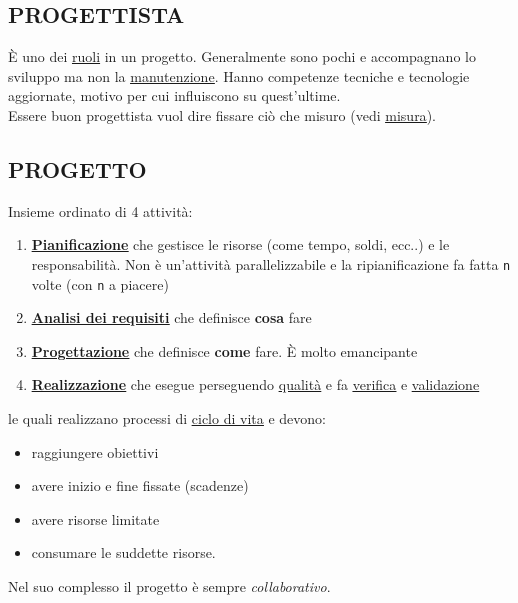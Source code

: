 		\subsection{PROGETTISTA}  \label{progettista}
		È uno dei \underline{\hyperref[ruoli]{ruoli}} in un progetto. Generalmente sono pochi e accompagnano lo sviluppo ma non la \underline{\hyperref[manutenzione]{manutenzione}}. Hanno competenze tecniche e tecnologie aggiornate, motivo per cui influiscono su quest'ultime. \\
		Essere buon progettista vuol dire fissare ciò che misuro (vedi \underline{\hyperref[misura]{misura}}).

		\subsection{PROGETTO}  \label{progetto}
		Insieme ordinato di 4 attività:
			\begin{enumerate}
				\item \underline{\hyperref[pianificazione]{\textbf{Pianificazione}}} che gestisce le risorse (come tempo, soldi, ecc..) e le responsabilità. Non è un'attività parallelizzabile e la ripianificazione fa fatta \texttt{n} volte (con \texttt{n} a piacere)
				\item \underline{\hyperref[analisideirequisiti]{\textbf{Analisi dei requisiti}}} che definisce \textbf{cosa} fare
				\item \underline{\hyperref[progettazione]{\textbf{Progettazione}}} che definisce \textbf{come} fare. È molto emancipante
				\item \underline{\hyperref[realizzazione]{\textbf{Realizzazione}}} che esegue perseguendo \underline{\hyperref[qualita]{qualità}} e fa \underline{\hyperref[verificare]{verifica}} e \underline{\hyperref[validare]{validazione}}
			\end{enumerate}
		le quali realizzano processi di \underline{\hyperref[ciclo]{ciclo di vita}} e devono:
			\begin {itemize}
				\item raggiungere obiettivi
				\item avere inizio e fine fissate (scadenze)
				\item avere risorse limitate
				\item consumare le suddette risorse.
			\end {itemize}
		Nel suo complesso il progetto è sempre \textit{collaborativo}.
